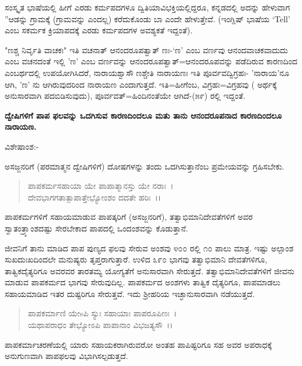 ಸಂಸ್ಕೃತ ಭಾಷೆಯಲ್ಲಿ ಹೀಗೆ ಎರಡು ಕರ್ಮಪದಗಳೂ ದ್ವಿತಿಯಾವಿಭಕ್ತಿಯಲ್ಲಿದ್ದರೂ, ಕನ್ನಡದಲ್ಲಿ ಅದನ್ನು ಹೇಳುವಾಗ ''ಆಡನ್ನು ಗ್ರಾಮಕ್ಕೆ (ಗ್ರಾಮವನ್ನು ಎಂದಲ್ಲ) ಕರೆದುಕೊಂಡು ಬಾ ಎಂದೇ ಹೇಳುತ್ತೇವೆ. (ಇಂಗ್ಲಿಷ್ ಭಾಷೆಯ `Tell' ಎಂಬ ಸಕರ್ಮಕ ಕ್ರಿಯಾಪದಕ್ಕೆ ಎರಡು ಕರ್ಮಪದಗಳ ಅವಶ್ಯಕತೆ ಇದ್ದಂತೆ).

"ಣಶ್ಚ ನಿರ್ವೃತಿ ವಾಚಕಃ" ಇತಿ ವಚನಾತ್ ಆನಂದರೂಪತ್ವಾತ್ ಣಃ-`ಣ' ಎಂಬ ವರ್ಣವು ಆನಂದವಾಚಕವಾದುದು ಎಂಬ ವಚನದಂತೆ ಇಲ್ಲಿ 'ಣ' ಎಂಬ ವರ್ಣವನ್ನು ಆನಂದರೂಪತ್ವಾತ್=ಆನಂದರೂಪವನ್ನು ಪಡೆದಿರುವ ಕಾರಣದಿಂದ ಎಂಬರ್ಥದಲ್ಲಿ ಉಪಯೋಗಿಸಿದರೆ, ನಾರಾಯಶ್ವಾಸೌ ಣಶ್ಚೇತಿ ನಾರಾಯಣಃ ಇತಿ ಪೂರ್ವವದ್ವಿಗ್ರಹಃ- 'ನಾರಾಯ'ನೂ ಆಗಿ, 'ಣ' ನು ಆಗಿರುವುದರಿಂದ ನಾರಾಯಣ ಎಂದಾಗುತ್ತದೆ. ಇತಿ=ಹೀಗೆಂಬ, ವಿಗ್ರಹಃ=ವಿಗ್ರಹವು ( ಅರ್ಥಕ್ಕೆ ಅನುಸಾರವಾಗಿ ಪದಬಿಡಿಸುವುದು), ಪೂರ್ವವತ್=ಹಿಂದಿನಂತೆಯೇ ಆಗಿದೆ-(೫೯) ರಲ್ಲಿ ಇದ್ದಂತೆ.

\begin{center}
\textbf{ ದ್ವೇಷಿಗಳಿಗೆ ಪಾಪ ಫಲವನ್ನು ಒದಗಿಸುವ ಕಾರಣದಿಂದಲೂ ಮತು ತಾನು ಆನಂದರೂಪನಾದ ಕಾರಣದಿಂದಲೂ ನಾರಾಯಣ.}
\end{center}

\noindent
ವಿಶೇಷಾಂಶ:-

ಅಸಜ್ಜನರಿಗೆ (ಪರಮಾತ್ಮನ ದ್ವೇಷಿಗಳಿಗೆ) ದೋಷಗಳನ್ನು ತಂದು ಒದಗಿಸುತ್ತಾನೆಂಬ ಪ್ರಮೇಯವನ್ನು ಗ್ರಹಿಸಬೇಕು.

\begin{verse}
ಪಾಪಕರ್ಮಸಹಾಯಾ ಯೇ ಪಾಪಾತ್ಮಾನಸ್ತು ಯೇ ನರಾಃ~।\\ ದೇವಭಾಗಗತಾತ್ಪಾಪಾತ್ತೇಭ್ಯೋಂಶಂ ದದತೇ ಹರಿಃ~।।
\end{verse}


ಪಾಪಕರ್ಮಗಳಿಗೆ ಸಹಾಯಮಾಡುವ ಪಾಪತ್ಕರಿಗೆ (ಅಸಜ್ಜನರಿಗೆ), ತತ್ವಾಭಿಮಾನಿದೇವತೆಗಳಿಗೆ ಅವರ ಸ್ವಾತಂತ್ರ್ಯಾಂಶದಷ್ಟು ಸೇರಬೇಕಾದ ಪಾಪದಲ್ಲಿ ಒಂದಂಶವನ್ನು ಕೊಡುತ್ತಾನೆ.

ಜೀವನಿಗೆ ತಾನು ಮಾಡಿದ ಪಾಪ ಪುಣ್ಯದ ಫಲವು ಸೇರುವ ಅಂಶವು ೪೦೦ ರಲ್ಲಿ ೧೦ ಪಾಲು ಮಾತ್ರ. ಇಷ್ಟು ಅಲ್ಪಾಂಶ ಸುಖದುಃಖದಿಂದಲೇ ಮನುಷ್ಯರು ತೃಪ್ತರಾಗುತ್ತಾರೆ. ಉಳಿದ ೩೯೦ ಭಾಗವು ತತ್ವಾಭಿಮಾನಿ ದೇವತೆಗಳಿಗೂ, ತಾತ್ವಿಕದೈತ್ಯರಿಗೂ ಅವರವರ ತಾರತಮ್ಯ ಯೋಗ್ಯತೆಗೆ ಅನುಸಾರವಾಗಿ ಸೇರುತ್ತದೆ. ತತ್ವಾಭಿಮಾನಿದೇವತೆಗಳಿಗೆ ಜೀವನು ಮಾಡುವ ಪಾಪಕರ್ಮದ ಭಾಗವು ಸೇರುವುದಿಲ್ಲ. ಪಾಪಕರ್ಮದ ಅಂಶಗಳು ತಾತ್ವಿಕ ದೈತ್ಯರಿಗೂ, ಪಾಪಮಾಡಲು ಸಹಾಯಮಾಡಿದ ಇತರ ದುಷ್ಟರಿಗೂ ಸೇರುತ್ತವೆ. ಇದು ಶ‍್ರೀಹರಿಯ ಇಚ್ಛಾನುಸಾರವಾಗಿ ನಡೆಯುತ್ತದೆ.

\begin{verse}
ಪಾಪಕರ್ಮಾಣಿ ಯೇsಪಿ ಸ್ಯುಃ ಸಹಾಯಾಃ ಪಾಪರೂಪಿಣಃ~।\\ ಯಥಾಪರಾಧಂ ತೇಭ್ಯೋಽಪಿ ಪಾಪಾನಾಂ ವಿಭಜತ್ಯಸೌ~।।
\end{verse}


ಪಾಪಕರ್ಮಾಚರಣೆಯಲ್ಲಿ ಯಾರು ಸಹಾಯಕರಾಗಿರುವರೋ ಅಂತಹ ಪಾಪಿಷ್ಟರಿಗೂ ಸಹ ಅವರ ಅಪರಾಧಕ್ಕೆ ಅನುಗುಣವಾಗಿ ಪಾಪಫಲವು ವಿಭಾಗಿಸಲ್ಪಡುತ್ತದೆ.

